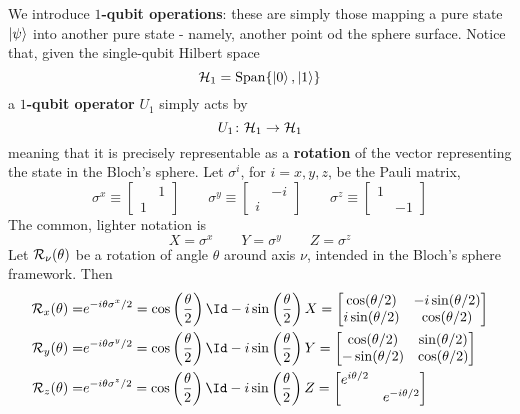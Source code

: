 We introduce \textbf{$1$-qubit operations}: these are simply those mapping a pure state $\ket{\psi}$ into another pure state - namely, another point od the sphere surface. Notice that, given the single-qubit Hilbert space
\[
    \mathcal{H}_1 =  \operatorname{Span} \lbrace \ket{0}, \ket{1} \rbrace
\]
a \textbf{$1$-qubit operator} $U_1$ simply acts by
\[
    U_1 \colon \mathcal{H}_1 \to \mathcal{H}_1
\]
meaning that it is precisely representable as a \textbf{rotation} of the vector representing the state in the Bloch's sphere. Let $\sigma^i$, for $i=x,y,z$, be the Pauli matrix,
\[
    \sigma^x \equiv \begin{bmatrix} & 1 \\ 1 & \end{bmatrix}
    \qquad
    \sigma^y \equiv \begin{bmatrix} & -i \\ i & \end{bmatrix}
    \qquad
    \sigma^z \equiv \begin{bmatrix} 1 & \\ & -1 \end{bmatrix}
\]
The common, lighter notation is
\[
    X = \sigma^x
    \qquad
    Y = \sigma^y
    \qquad
    Z = \sigma^z
\]
Let $\mathcal{R}_\nu (\theta)$ be a rotation of angle $\theta$ around axis $\nu$, intended in the Bloch's sphere framework. Then
\[
\begin{aligned}
    \Rotation_x (\theta) =& e^{-i \theta \sigma^x /2 } = \cos \lrR{\frac{\theta}{2}} \Id - i \sin \lrR{\frac{\theta}{2}} X = \begin{bmatrix}
        \cos(\theta/2) & -i \sin(\theta/2) \\
        i \sin(\theta/2) & \cos(\theta/2)
    \end{bmatrix} \\
    \Rotation_y (\theta) =& e^{-i \theta \sigma^y /2 } = \cos \lrR{\frac{\theta}{2}} \Id - i \sin \lrR{\frac{\theta}{2}} Y = \begin{bmatrix}
        \cos(\theta/2) & \sin(\theta/2) \\
        - \sin(\theta/2) & \cos(\theta/2)
    \end{bmatrix} \\
    \Rotation_z (\theta) =& e^{-i \theta \sigma^z /2 } = \cos \lrR{\frac{\theta}{2}} \Id - i \sin \lrR{\frac{\theta}{2}} Z = \begin{bmatrix}
        e^{i\theta/2} & \\
        & e^{-i\theta/2}
    \end{bmatrix} \\
\end{aligned}
\]
